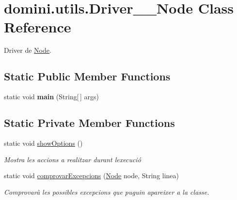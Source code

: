 \hypertarget{classdomini_1_1utils_1_1Driver____Node}{}\section{domini.\+utils.\+Driver\+\_\+\+\_\+\+Node Class Reference}
\label{classdomini_1_1utils_1_1Driver____Node}


Driver de \hyperlink{classdomini_1_1utils_1_1Node}{Node}.  


\subsection*{Static Public Member Functions}
\begin{DoxyCompactItemize}
\item 
\mbox{\label{classdomini_1_1utils_1_1Driver____Node_abfb5f35b8100dec9d147a79af04df017}} 
static void {\bfseries main} (String\mbox{[}$\,$\mbox{]} args)
\end{DoxyCompactItemize}
\subsection*{Static Private Member Functions}
\begin{DoxyCompactItemize}
\item 
\mbox{\label{classdomini_1_1utils_1_1Driver____Node_a3e1022f470676f7cbbeb44b9b2d4f66f}} 
static void \hyperlink{classdomini_1_1utils_1_1Driver____Node_a3e1022f470676f7cbbeb44b9b2d4f66f}{show\+Options} ()
\begin{DoxyCompactList}\small\item\em Mostra les accions a realitzar durant l\textquotesingle{}execució \end{DoxyCompactList}\item 
static void \hyperlink{classdomini_1_1utils_1_1Driver____Node_a9fdd311953250227bb70d67cbf20bbb4}{comprovar\+Excepcions} (\hyperlink{classdomini_1_1utils_1_1Node}{Node} node, String linea)
\begin{DoxyCompactList}\small\item\em Comprovarà les possibles excepcions que puguin apareixer a la classe. \end{DoxyCompactList}\end{DoxyCompactItemize}


